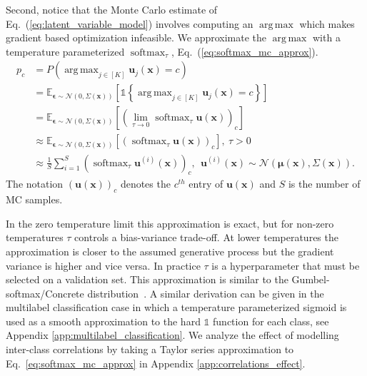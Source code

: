 \documentclass[final]{cvpr}
\DeclareMathOperator*{\argmax}{arg\,max}
\DeclareMathOperator*{\softmax}{softmax}
\newcommand{\brac}[1]{\left[#1\right]}
\newcommand{\parencurly}[1]{\left\{#1\right\}}
\begin{document}
Second, notice that the Monte Carlo estimate of Eq.\ (\ref{eq:latent_variable_model}) involves computing an $\argmax$ which makes gradient based optimization infeasible. We approximate the $\argmax$ with a temperature parameterized $\softmax_{\tau}$, Eq.\ (\ref{eq:softmax_mc_approx}). 
\begin{equation}
\begin{split}
    p_c &= P(\argmax_{j \in [K]} \mathbf{u}_j(\mathbf{x}) = c) \\
    &= \mathbb{E}_{\boldsymbol{\epsilon} \sim \mathcal{N}(0, \Sigma(\mathbf{x}))} \brac{\mathds{1} \parencurly{\argmax_{j \in [K]} \mathbf{u}_j(\mathbf{x}) = c}} \\
    &= \mathbb{E}_{\boldsymbol{\epsilon} \sim \mathcal{N}(0, \Sigma(\mathbf{x}))} \brac{(\lim_{\tau \to 0} \softmax_{\tau} \mathbf{u}(\mathbf{x}))_c} \\
    &\approx \mathbb{E}_{\boldsymbol{\epsilon} \sim \mathcal{N}(0, \Sigma(\mathbf{x}))} \brac{(\softmax_{\tau} \mathbf{u}(\mathbf{x}))_c}, \ \tau > 0 \\
    &\approx \frac{1}{S} \sum_{i=1}^S (\softmax_{\tau} \mathbf{u}^{(i)}(\mathbf{x}))_c ,\ \  \mathbf{u}^{(i)}(\mathbf{x}) \sim \mathcal{N}(\boldsymbol{\mu}(\mathbf{x}), \Sigma(\mathbf{x})).
\end{split}
\label{eq:softmax_mc_approx}
\end{equation}
The notation $(\mathbf{u}(\mathbf{x}))_c$ denotes the $c^{th}$ entry of $\mathbf{u}(\mathbf{x})$ and $S$ is the number of MC samples.

In the zero temperature limit this approximation is exact, but for non-zero temperatures $\tau$ controls a bias-variance trade-off. At lower temperatures the approximation is closer to the assumed generative process but the gradient variance is higher and vice versa. In practice $\tau$ is a hyperparameter that must be selected on a validation set. This approximation is similar to the Gumbel-softmax/Concrete distribution~\cite{gumbelsoftmax2017,concrete2017}. 
A similar derivation can be given in the multilabel classification case in which a temperature parameterized sigmoid is used as a smooth approximation to the hard $\mathds{1}$ function for each class, see Appendix \ref{app:multilabel_classification}. We analyze the effect of modelling inter-class correlations by taking a Taylor series approximation to Eq.~\ref{eq:softmax_mc_approx} in Appendix \ref{app:correlations_effect}.
\end{document}
